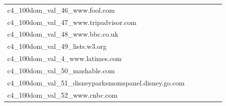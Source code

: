 \documentclass[dvipsnames]{article}
\begin{document}
\begin{appendix}
{\begin{longtable}{m{6cm}m{1.7cm}m{1.7cm}m{1.7cm}m{1.7cm}m{1.7cm}}
	c4\_100dom\_val\_46\_www.fool.com  & \colorbox[HTML]{ffffe5}{\makebox[\mywidth][c]{11.03}} & \colorbox[HTML]{f3fab6}{\makebox[\mywidth][c]{10.63}} & \colorbox[HTML]{ffffe5}{\makebox[\mywidth][c]{11.35}} & \colorbox[HTML]{e0f2a8}{\makebox[\mywidth][c]{10.56}} & \colorbox[HTML]{77c578}{\makebox[\mywidth][c]{10.42}}\\
	c4\_100dom\_val\_47\_www.tripadvisor.com  & \colorbox[HTML]{ffffe5}{\makebox[\mywidth][c]{15.80}} & \colorbox[HTML]{f7fcbb}{\makebox[\mywidth][c]{15.26}} & \colorbox[HTML]{ffffe5}{\makebox[\mywidth][c]{16.26}} & \colorbox[HTML]{d9f0a3}{\makebox[\mywidth][c]{15.10}} & \colorbox[HTML]{77c578}{\makebox[\mywidth][c]{14.93}}\\
	c4\_100dom\_val\_48\_www.bbc.co.uk  & \colorbox[HTML]{fefee3}{\makebox[\mywidth][c]{12.55}} & \colorbox[HTML]{f2fab5}{\makebox[\mywidth][c]{12.10}} & \colorbox[HTML]{ffffe5}{\makebox[\mywidth][c]{13.02}} & \colorbox[HTML]{daf0a4}{\makebox[\mywidth][c]{12.00}} & \colorbox[HTML]{77c578}{\makebox[\mywidth][c]{11.85}}\\
	c4\_100dom\_val\_49\_lists.w3.org  & \colorbox[HTML]{fdfedc}{\makebox[\mywidth][c]{18.75}} & \colorbox[HTML]{edf8b2}{\makebox[\mywidth][c]{18.24}} & \colorbox[HTML]{ffffe5}{\makebox[\mywidth][c]{19.89}} & \colorbox[HTML]{cae99c}{\makebox[\mywidth][c]{18.05}} & \colorbox[HTML]{77c578}{\makebox[\mywidth][c]{17.84}}\\
	c4\_100dom\_val\_4\_www.latimes.com  & \colorbox[HTML]{fefee2}{\makebox[\mywidth][c]{11.88}} & \colorbox[HTML]{ebf7b0}{\makebox[\mywidth][c]{11.46}} & \colorbox[HTML]{ffffe5}{\makebox[\mywidth][c]{12.40}} & \colorbox[HTML]{d7efa2}{\makebox[\mywidth][c]{11.39}} & \colorbox[HTML]{77c578}{\makebox[\mywidth][c]{11.24}}\\
	c4\_100dom\_val\_50\_mashable.com  & \colorbox[HTML]{fefee3}{\makebox[\mywidth][c]{12.44}} & \colorbox[HTML]{e7f5ad}{\makebox[\mywidth][c]{11.95}} & \colorbox[HTML]{ffffe5}{\makebox[\mywidth][c]{12.85}} & \colorbox[HTML]{d7efa2}{\makebox[\mywidth][c]{11.90}} & \colorbox[HTML]{77c578}{\makebox[\mywidth][c]{11.76}}\\
	c4\_100dom\_val\_51\_disneyparksmomspanel.disney.go.com  & \colorbox[HTML]{ffffe5}{\makebox[\mywidth][c]{11.99}} & \colorbox[HTML]{f9fcc6}{\makebox[\mywidth][c]{11.29}} & \colorbox[HTML]{ffffe5}{\makebox[\mywidth][c]{11.98}} & \colorbox[HTML]{e2f3a9}{\makebox[\mywidth][c]{11.16}} & \colorbox[HTML]{77c578}{\makebox[\mywidth][c]{11.00}}\\
	c4\_100dom\_val\_52\_www.cnbc.com  & \colorbox[HTML]{fefee3}{\makebox[\mywidth][c]{10.65}} & \colorbox[HTML]{f7fcba}{\makebox[\mywidth][c]{10.32}} & \colorbox[HTML]{ffffe5}{\makebox[\mywidth][c]{10.99}} & \colorbox[HTML]{e1f3a9}{\makebox[\mywidth][c]{10.24}} & \colorbox[HTML]{77c578}{\makebox[\mywidth][c]{10.10}}\\

\end{longtable}}
\end{appendix}
\end{document}
